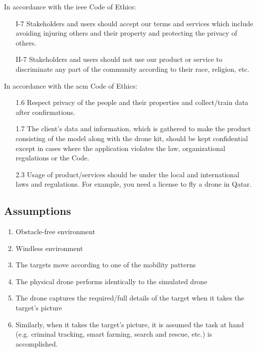 \documentclass[../main.tex]{subfiles}
\begin{document}
\noindent
In accordance with the \gls{ieee} Code of Ethics:
\begin{itemize}
    \item[I-7] Stakeholders and users 
        should accept our terms and services which include 
        avoiding injuring others and their property 
        and protecting the privacy of others.
    \item[II-7] Stakeholders and users should not use our product 
        or service to discriminate any
        part of the community according 
        to their race, religion, etc.
\end{itemize}

\noindent
In accordance with the \gls{acm} Code of Ethics:
\begin{itemize}
    \item[1.6] Respect privacy of the people and their 
        properties and collect/train data after confirmations.
    \item[1.7] The client's data and information, which is gathered 
        to make the product consisting of the model along with 
        the drone kit, should be kept confidential except in cases 
        where the application violates the law, 
        organizational regulations or the Code.
    \item[2.3] Usage of product/services should be under 
        the local and international laws and regulations. 
        For example, you need a license to fly a drone in Qatar.
\end{itemize}

\subsection{Assumptions}

\begin{enumerate}
    \item Obstacle-free environment
    \item Windless environment
    \item The targets move according to one of the mobility patterns
    \item The physical \anafi drone performs identically to the simulated \anafi drone
    \item The \anafi drone captures the required/full details of the target 
        when it takes the target’s picture
    \item Similarly, when it takes the target’s picture, 
        it is assumed the task at hand 
        (e.g. criminal tracking, smart farming, search and rescue, etc.) 
        is accomplished.
\end{enumerate}
\end{document}
